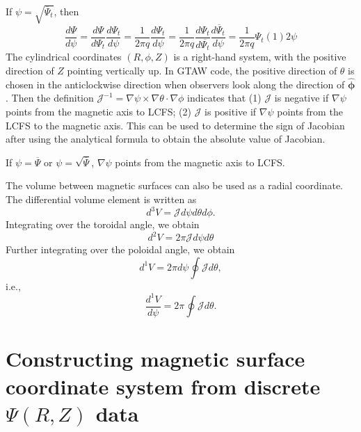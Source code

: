 \documentclass{article}
\newcommand{\tmmathbf}[1]{\ensuremath{\boldsymbol{#1}}}
\begin{document}
If $\psi = \sqrt{\overline{\Psi}_t}$, then
\begin{equation}
  \frac{d \Psi}{d \psi} = \frac{d \Psi}{d \Psi_t}  \frac{d \Psi_t}{d \psi} =
  \frac{1}{2 \pi q}  \frac{d \Psi_t}{d \psi} = \frac{1}{2 \pi q}  \frac{d
  \Psi_t}{d \overline{\Psi_t}}  \frac{d \overline{\Psi}_t}{d \psi} =
  \frac{1}{2 \pi q} \Psi_t (1) 2 \psi
\end{equation}
The cylindrical coordinates $(R, \phi, Z)$ is a right-hand system, with the
positive direction of $Z$ pointing vertically up. In GTAW code, the positive
direction of $\theta$ is chosen in the anticlockwise direction when observers
look along the direction of $\hat{\tmmathbf{\phi}}$. Then the definition
$\mathcal{J}^{- 1} = \nabla \psi \times \nabla \theta \cdot \nabla \phi$
indicates that (1) $\mathcal{J}$ is negative if $\nabla \psi$ points from the
magnetic axis to LCFS; (2) $\mathcal{J}$ is positive if $\nabla \psi$ points
from the LCFS to the magnetic axis. This can be used to determine the sign of
Jacobian after using the analytical formula to obtain the absolute value of
Jacobian.

If $\psi = \overline{\Psi}$ or $\psi = \sqrt{\overline{\Psi}}$, $\nabla \psi$
points from the magnetic axis to LCFS.

The volume between magnetic surfaces can also be used as a radial coordinate.
The differential volume element is written as
\begin{equation}
  d^3 V = \mathcal{J} d \psi d \theta d \phi .
\end{equation}
Integrating over the toroidal angle, we obtain
\begin{equation}
  d^2 V = 2 \pi \mathcal{J} d \psi d \theta
\end{equation}
Further integrating over the poloidal angle, we obtain
\begin{equation}
  d^1 V = 2 \pi d \psi \oint \mathcal{J} d \theta,
\end{equation}
i.e.,
\begin{equation}
  \frac{d^1 V}{d \psi} = 2 \pi \oint \mathcal{J} d \theta .
\end{equation}


\section{\label{6-25-1}Constructing magnetic surface coordinate system from
discrete $\Psi (R, Z)$ data}
\end{document}
